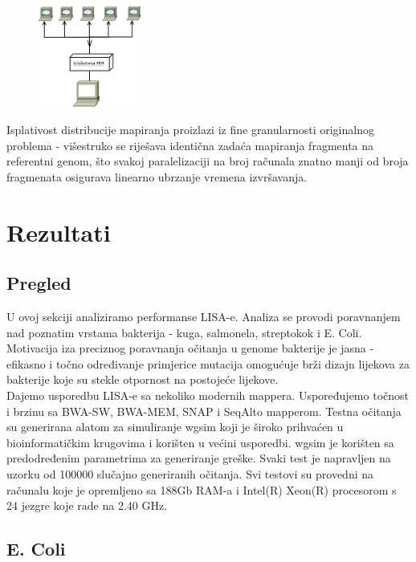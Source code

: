 \documentclass[times, utf8, diplomski]{fer}
\begin{document}
\nopagebreak
\begin{figure}[!ht]
\begin{center}
	\includegraphics[width=0.3\textwidth]{../img/MPI.png}
	\caption{}
\end{center}
\end{figure}

Isplativost distribucije mapiranja proizlazi iz fine granularnosti originalnog problema - višestruko se riješava identična zadaća mapiranja fragmenta na referentni genom, što svakoj paralelizaciji na broj računala znatno manji od broja fragmenata osigurava linearno ubrzanje vremena izvršavanja.

\chapter{Rezultati}

\section {Pregled}
U ovoj sekciji analiziramo performanse LISA-e. Analiza se provodi poravnanjem nad poznatim vrstama bakterija - kuga, salmonela, streptokok i E. Coli. Motivacija iza preciznog poravnanja očitanja u genome bakterije je jasna - efikasno i točno određivanje primjerice mutacija omogućuje brži dizajn lijekova za bakterije koje su stekle otpornost na postojeće lijekove.\\
Dajemo usporedbu LISA-e sa nekoliko modernih mappera. Uspoređujemo točnost i brzinu sa BWA-SW, BWA-MEM, SNAP i SeqAlto mapperom. Testna očitanja su generirana alatom za simuliranje wgsim koji je široko prihvaćen u bioinformatičkim krugovima i korišten u većini usporedbi. wgsim je korišten sa predodređenim parametrima za generiranje greške. Svaki test je napravljen na uzorku od 100000 slučajno generiranih očitanja. 
Svi testovi su provedni na računalu koje je opremljeno sa 188Gb RAM-a i Intel(R) Xeon(R) procesorom s 24 jezgre koje rade na 2.40 GHz. 

\section {E. Coli}
\end{document}
